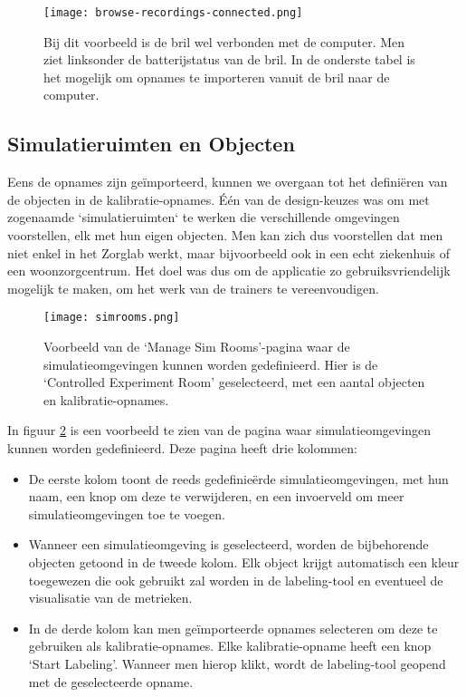 \begin{figure}[H]
  \centering
  \texttt{[image: browse-recordings-connected.png]}
  \caption[]{\label{fig:browse-recordings-connected} Bij dit voorbeeld is de bril wel verbonden met de computer. Men ziet linksonder de batterijstatus van de bril. In de onderste tabel is het mogelijk om opnames te importeren vanuit de bril naar de computer. }
\end{figure}

\subsection{Simulatieruimten en Objecten}

Eens de opnames zijn geïmporteerd, kunnen we overgaan tot het definiëren van de objecten in de kalibratie-opnames. Één van de design-keuzes was om met zogenaamde `simulatieruimten` te werken die verschillende omgevingen voorstellen, elk met hun eigen objecten.
Men kan zich dus voorstellen dat men niet enkel in het Zorglab werkt, maar bijvoorbeeld ook in een echt ziekenhuis of een woonzorgcentrum. Het doel was dus om de applicatie zo gebruiksvriendelijk mogelijk te maken, om het werk van de trainers te vereenvoudigen.

\begin{figure}[H]
  \centering
  \texttt{[image: simrooms.png]}
  \caption[]{\label{fig:simrooms} Voorbeeld van de `Manage Sim Rooms'-pagina waar de simulatieomgevingen kunnen worden gedefinieerd. Hier is de `Controlled Experiment Room' geselecteerd, met een aantal objecten en kalibratie-opnames. }
\end{figure}

In figuur \ref{fig:simrooms} is een voorbeeld te zien van de pagina waar simulatieomgevingen kunnen worden gedefinieerd. 
Deze pagina heeft drie kolommen:
\begin{itemize}
    \item De eerste kolom toont de reeds gedefinieërde simulatieomgevingen, met hun naam, een knop om deze te verwijderen, en een invoerveld om meer simulatieomgevingen toe te voegen.
    \item Wanneer een simulatieomgeving is geselecteerd, worden de bijbehorende objecten getoond in de tweede kolom. Elk object krijgt automatisch een kleur toegewezen die ook gebruikt zal worden in de labeling-tool en eventueel de visualisatie van de metrieken.
    \item In de derde kolom kan men geïmporteerde opnames selecteren om deze te gebruiken als kalibratie-opnames. Elke kalibratie-opname heeft een knop `Start Labeling'. Wanneer men hierop klikt, wordt de labeling-tool geopend met de geselecteerde opname.
\end{itemize}

